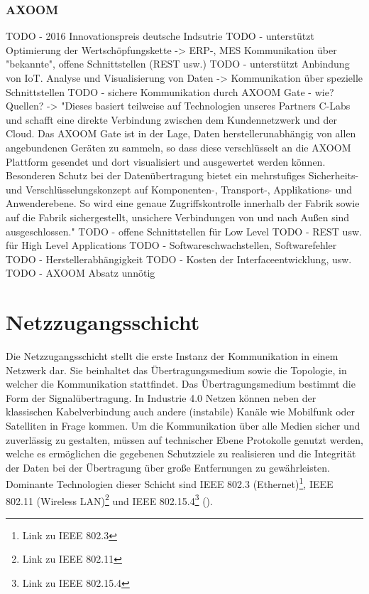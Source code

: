 \subsubsection{AXOOM}
TODO - 2016 Innovationspreis deutsche Indsutrie
TODO - unterstützt Optimierung der Wertschöpfungskette -> ERP-, MES Kommunikation über "bekannte", offene Schnittstellen (REST usw.) 
TODO - unterstützt Anbindung von \ac{IoT}. Analyse und Visualisierung von Daten -> Kommunikation über spezielle Schnittstellen
TODO - sichere Kommunikation durch AXOOM Gate - wie? Quellen? -> "Dieses basiert teilweise auf Technologien unseres Partners C-Labs und schafft eine direkte Verbindung zwischen dem Kundennetzwerk und der Cloud. Das AXOOM Gate ist in der Lage, Daten herstellerunabhängig von allen angebundenen Geräten zu sammeln, so dass diese verschlüsselt an die AXOOM Plattform gesendet und dort visualisiert und ausgewertet werden können. Besonderen Schutz bei der Datenübertragung bietet ein mehrstufiges Sicherheits- und Verschlüsselungskonzept auf Komponenten-, Transport-, Applikations- und Anwenderebene. So wird eine genaue Zugriffskontrolle innerhalb der Fabrik sowie auf die Fabrik sichergestellt, unsichere Verbindungen von und nach Außen sind ausgeschlossen."
TODO - offene Schnittstellen für Low Level
TODO - REST usw. für High Level Applications
TODO - Softwareschwachstellen, Softwarefehler 
TODO - Herstellerabhängigkeit
TODO - Kosten der Interfaceentwicklung, usw.
TODO - AXOOM Absatz unnötig

\section{Netzzugangsschicht}
Die Netzzugangsschicht stellt die erste Instanz der Kommunikation in einem Netzwerk dar. Sie beinhaltet das Übertragungsmedium sowie die Topologie, in welcher die Kommunikation stattfindet. Das Übertragungsmedium bestimmt die Form der Signalübertragung. In Industrie 4.0 Netzen können neben der klassischen Kabelverbindung auch andere (instabile) Kanäle wie Mobilfunk oder Satelliten in Frage kommen. Um die Kommunikation über alle Medien sicher und zuverlässig zu gestalten, müssen auf technischer Ebene Protokolle genutzt werden, welche es ermöglichen die gegebenen Schutzziele zu realisieren und die Integrität der Daten bei der Übertragung über große Entfernungen zu gewährleisten. Dominante Technologien dieser Schicht sind \ac{IEEE} 802.3 (Ethernet)\footnote{Link zu IEEE 802.3}, \ac{IEEE} 802.11 (Wireless LAN)\footnote{Link zu IEEE 802.11} und \ac{IEEE} 802.15.4\footnote{Link zu IEEE 802.15.4} (\cite{sichKom2017}).

